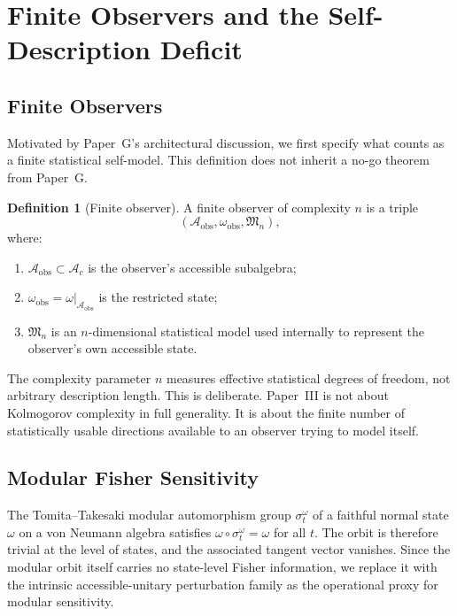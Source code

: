 \documentclass[12pt]{article}
\theoremstyle{definition}
\newtheorem{definition}[theorem]{Definition}
\theoremstyle{remark}
\begin{document}
\section{Finite Observers and the Self-Description Deficit}\label{sec:2}

\subsection{Finite Observers}\label{subsec:2.1}

Motivated by Paper~G's architectural discussion, we first specify what
counts as a finite statistical self-model. This definition does not
inherit a no-go theorem from Paper~G.

\begin{definition}[Finite observer]\label{def:2.1}
A finite observer of complexity \(n\) is a triple
\[
(\mathcal{A}_{\mathrm{obs}},\omega_{\mathrm{obs}},\mathfrak{M}_n),
\]
where:
\begin{enumerate}
\item \(\mathcal{A}_{\mathrm{obs}} \subset \mathcal{A}_c\) is the
observer's accessible subalgebra;
\item \(\omega_{\mathrm{obs}} = \omega|_{\mathcal{A}_{\mathrm{obs}}}\)
is the restricted state;
\item \(\mathfrak{M}_n\) is an \(n\)-dimensional statistical model used
internally to represent the observer's own accessible state.
\end{enumerate}
\end{definition}

The complexity parameter \(n\) measures effective statistical degrees of
freedom, not arbitrary description length. This is deliberate. Paper~III
is not about Kolmogorov complexity in full generality. It is about the
finite number of statistically usable directions available to an
observer trying to model itself.

\subsection{Modular Fisher Sensitivity}\label{subsec:2.1b}

The Tomita--Takesaki modular automorphism group
\(\sigma_t^\omega\) of a faithful normal state \(\omega\) on a von
Neumann algebra satisfies \(\omega\circ\sigma_t^\omega=\omega\) for
all \(t\). The orbit is therefore trivial at the level of states, and
the associated tangent vector vanishes. Since the modular orbit itself
carries no state-level Fisher information, we replace it with the
intrinsic accessible-unitary perturbation family as the operational
proxy for modular sensitivity.
\end{document}
